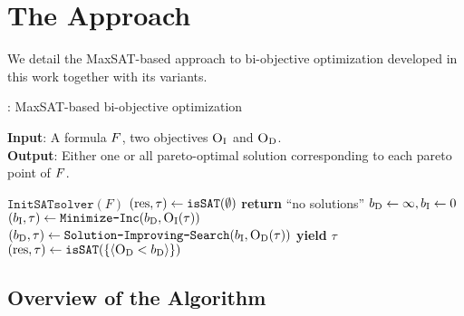 \chapter{The Approach\label{chap:approach}}

We detail the MaxSAT-based approach to bi-objective optimization developed in this work together with its variants.

\begin{algorithm}[t]
  \caption{\algname: MaxSAT-based  bi-objective optimization} %
  \label{alg:base-algorithm}
  \textbf{Input}: A formula $F$, two objectives $\textsc{O}_{\text{I}}$ and $\textsc{O}_{\text{D}}$.\\
  \textbf{Output}: Either one or all pareto-optimal solution corresponding to each pareto point of $F$.

  \begin{algorithmic}[1]
    \STATE $\texttt{InitSATsolver}(F)$ \label{l:init-solv} 
    \STATE $(\text{res}, \tau) \gets \texttt{isSAT}(\emptyset)$ \quad{}  \label{l:sols} 
      \STATE \textbf{return} ``no solutions''
    \ENDIF
    \STATE $b_{\text{D}} \gets \infty, b_{\text{I}} \gets 0$ \label{l:bounds}
     \label{l:loopstart}
    \STATE $(b_{\text{I}}, \tau) \gets \texttt{Minimize-\allowbreak{}Inc}(b_{\text{D}} , \textsc{O}_{\text{I}}(\tau))$  \quad{}\label{l:minim1}
    \STATE $(b_{\text{D}}, \tau) \gets  \texttt{Solution-\allowbreak{}Improving-\allowbreak{}Search}(b_{\text{I}} , \textsc{O}_{\text{D}}(\tau))$  \quad{}\label{l:minim2}
    \STATE \textbf{yield} $\tau$  \quad{} \label{ln:stage3} 
    \STATE $(\text{res}, \tau) \gets \texttt{isSAT}(\{\langle \textsc{O}_{\text{D}} < b_{\text{D}} \rangle\})$\label{l:endL}
    \ENDWHILE
  \end{algorithmic}
\end{algorithm}

\section{Overview of the Algorithm\label{sec:algorithm}}

